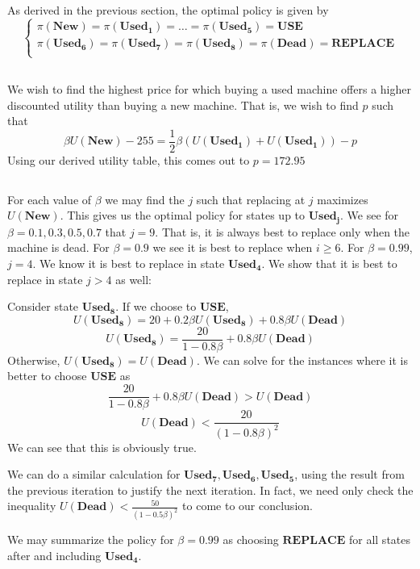 \documentclass{article}
\newenvironment{myindentpar}[1]
  {\begin{list}{}
          {\setlength{\leftmargin}{#1}
          \setlength{\rightmargin}{#1}}
          \item[]
  }
  {\end{list}}
\begin{document}
\subsection{}
As derived in the previous section, the optimal policy is given by
\begin{equation*}
\begin{cases}
\pi(\mathbf{New}) = \pi(\mathbf{Used_1}) = \dots = \pi(\mathbf{Used_5}) = \mathbf{USE}\\
\pi(\mathbf{Used_6}) = \pi(\mathbf{Used_7}) = \pi(\mathbf{Used_8}) = \pi(\mathbf{Dead}) = \mathbf{REPLACE}\\
\end{cases}
\end{equation*}

\subsection{}
We wish to find the highest price for which buying a used machine offers a higher discounted utility than buying a new machine. That is, we wish to find $p$ such that
$$\beta U(\mathbf{New}) - 255 = \frac{1}{2}\beta(U(\mathbf{Used_1})+U(\mathbf{Used_1})) - p$$
Using our derived utility table, this comes out to $p = 172.95$

\subsection{}
For each value of $\beta$ we may find the $j$ such that replacing at $j$ maximizes $U(\mathbf{New})$. This gives us the optimal policy for states up to $\mathbf{Used_j}$. We see for $\beta = 0.1,0.3,0.5,0.7$ that $j = 9$. That is, it is always best to replace only when the machine is dead. For $\beta = 0.9$ we see it is best to replace when $i \geqslant 6$. For $\beta = 0.99$, $j = 4$. We know it is best to replace in state $\mathbf{Used_4}$. We show that it is best to replace in state $j > 4$ as well:
\begin{myindentpar}{1em}
Consider state $\mathbf{Used_8}$. If we choose to $\mathbf{USE}$,
$$U(\mathbf{Used_8}) = 20 + 0.2\beta U(\mathbf{Used_8}) + 0.8\beta U(\mathbf{Dead})$$
$$U(\mathbf{Used_8}) = \frac{20}{1-0.8\beta} + 0.8\beta U(\mathbf{Dead})$$
Otherwise, $U(\mathbf{Used_8}) = U(\mathbf{Dead})$. We can solve for the instances where it is better to choose $\mathbf{USE}$ as
$$\frac{20}{1-0.8\beta} + 0.8\beta U(\mathbf{Dead}) > U(\mathbf{Dead})$$
$$U(\mathbf{Dead}) < \frac{20}{(1-0.8\beta)^2}$$
We can see that this is obviously true.

We can do a similar calculation for $\mathbf{Used_7}, \mathbf{Used_6}, \mathbf{Used_5}$, using the result from the previous iteration to justify the next iteration. In fact, we need only check the inequality $U(\mathbf{Dead}) < \frac{50}{(1-0.5\beta)^2}$ to come to our conclusion.
\end{myindentpar}
We may summarize the policy for $\beta = 0.99$ as choosing $\mathbf{REPLACE}$ for all states after and including $\mathbf{Used_4}$.
\end{document}
